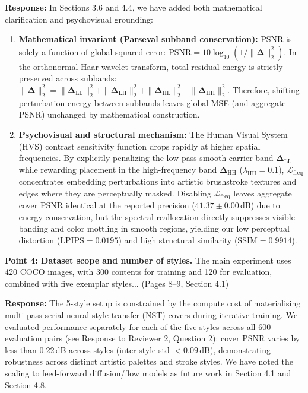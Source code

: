 \documentclass[11pt,a4paper]{article}
\begin{document}
\noindent \textbf{Response:} In Sections 3.6 and 4.4, we have added both mathematical clarification and psychovisual grounding:
\begin{enumerate}[leftmargin=*]
\item \textbf{Mathematical invariant (Parseval subband conservation):} PSNR is solely a function of global squared error: $\text{PSNR} = 10 \log_{10}(1 / \|\boldsymbol{\Delta}\|_2^2)$. In the orthonormal Haar wavelet transform, total residual energy is strictly preserved across subbands: $\|\boldsymbol{\Delta}\|_2^2 = \|\boldsymbol{\Delta}_{\text{LL}}\|_2^2 + \|\boldsymbol{\Delta}_{\text{LH}}\|_2^2 + \|\boldsymbol{\Delta}_{\text{HL}}\|_2^2 + \|\boldsymbol{\Delta}_{\text{HH}}\|_2^2$. Therefore, shifting perturbation energy between subbands leaves global MSE (and aggregate PSNR) unchanged by mathematical construction.
\item \textbf{Psychovisual and structural mechanism:} The Human Visual System (HVS) contrast sensitivity function drops rapidly at higher spatial frequencies. By explicitly penalizing the low-pass smooth carrier band $\boldsymbol{\Delta}_{\text{LL}}$ while rewarding placement in the high-frequency band $\boldsymbol{\Delta}_{\text{HH}}$ ($\lambda_{\text{HH}}=0.1$), $\mathcal{L}_{\text{freq}}$ concentrates embedding perturbations into artistic brushstroke textures and edges where they are perceptually masked. Disabling $\mathcal{L}_{\text{freq}}$ leaves aggregate cover PSNR identical at the reported precision ($41.37\pm0.00$\,dB) due to energy conservation, but the spectral reallocation directly suppresses visible banding and color mottling in smooth regions, yielding our low perceptual distortion ($\text{LPIPS}=0.0195$) and high structural similarity ($\text{SSIM}=0.9914$).
\end{enumerate}

\begin{revcomment}
\textbf{Point 4: Dataset scope and number of styles.} The main experiment uses 420 COCO images, with 300 contents for training and 120 for evaluation, combined with five exemplar styles... (Pages 8--9, Section 4.1)
\end{revcomment}

\noindent \textbf{Response:} The 5-style setup is constrained by the compute cost of materialising multi-pass serial neural style transfer (NST) covers during iterative training. We evaluated performance separately for each of the five styles across all 600 evaluation pairs (see Response to Reviewer 2, Question 2): cover PSNR varies by less than $0.22$\,dB across styles (inter-style std $<0.09$\,dB), demonstrating robustness across distinct artistic palettes and stroke styles. We have noted the scaling to feed-forward diffusion/flow models as future work in Section 4.1 and Section 4.8.
\end{document}
